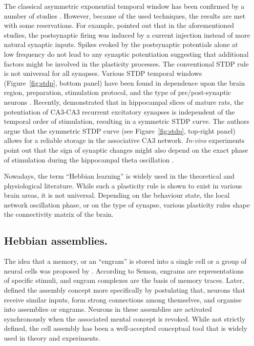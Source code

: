     The classical asymmetric exponential temporal window has been confirmed by
    a number of studies \citep[e.g.,][]{Debanne1998, Zhang1998}. However,
    because of the used techniques, the results are met with some reservations.
    For example, \cite{Lisman2005} pointed out that in the aforementioned
    studies, the postsynaptic firing was induced by a current injection instead
    of more natural synaptic inputs. Spikes evoked by the postsynaptic
    potentials alone at low frequency do not lead to any synaptic potentiation
    \citep{Wittenberg2006} suggesting that additional factors might be involved
    in the plasticity processes. The conventional STDP rule
    \citep[i.e.,][]{Bi1998, Kempter1999} is not universal for all synapses.
    Various STDP temporal windows (Figure~\ref{fig:stdp}, bottom panel) have
    been found in dependence upon the brain region, preparation, stimulation
    protocol, and the type of pre/post-synaptic neurons \citep{Feldman2012,
    Vogels2013}. Recently, \cite{Mishra2016} demonstrated that in hippocampal
    slices of mature rats, the potentiation of CA3-CA3 recurrent excitatory
    synapses is independent of the temporal order of stimulation, resulting in
    a symmetric STDP curve. The authors argue that the symmetric STDP curve
    (see Figure~\ref{fig:stdp}, top-right panel) allows for a reliable storage
    in the associative CA3 network. {\it In-vivo} experiments point out that
    the sign of synaptic changes might also depend on the exact phase of
    stimulation during the hippocampal theta oscillation \citep{Hoelscher1997}.

    Nowadays, the term ``Hebbian learning'' is widely used in the theoretical and
    physiological literature. While such a plasticity rule is shown to exist in
    various brain areas, it is not universal. Depending on the behaviour state,
    the local network oscillation phase, or on the type of synapse, various
    plasticity rules shape the connectivity matrix of the brain.

  \subsection{Hebbian assemblies.}
    The idea that a memory, or an ``engram'' is stored into a single cell or a
    group of neural cells was proposed by \cite{Semon1904}. According to Semon,
    engrams are representations of specific stimuli, and engram complexes are
    the basis of memory traces. Later, \cite{Hebb49} defined the assembly
    concept more specifically by postulating that, neurons that receive similar
    inputs, form strong connections among themselves, and organise into assemblies
    or engrams. Neurons in these assemblies are activated synchronously when
    the associated mental concept is revoked. While not strictly defined, the
    cell assembly has been a well-accepted conceptual tool that is widely used
    in theory and experiments.
   
